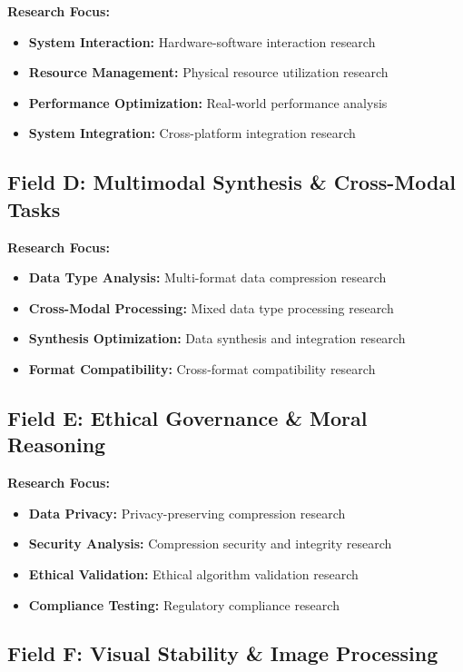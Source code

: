 \documentclass[12pt,a4paper]{article}
\begin{document}
\textbf{Research Focus:}
\begin{itemize}
    \item \textbf{System Interaction:} Hardware-software interaction research
    \item \textbf{Resource Management:} Physical resource utilization research
    \item \textbf{Performance Optimization:} Real-world performance analysis
    \item \textbf{System Integration:} Cross-platform integration research
\end{itemize}

\subsection{Field D: Multimodal Synthesis \& Cross-Modal Tasks}

\textbf{Research Focus:}
\begin{itemize}
    \item \textbf{Data Type Analysis:} Multi-format data compression research
    \item \textbf{Cross-Modal Processing:} Mixed data type processing research
    \item \textbf{Synthesis Optimization:} Data synthesis and integration research
    \item \textbf{Format Compatibility:} Cross-format compatibility research
\end{itemize}

\subsection{Field E: Ethical Governance \& Moral Reasoning}

\textbf{Research Focus:}
\begin{itemize}
    \item \textbf{Data Privacy:} Privacy-preserving compression research
    \item \textbf{Security Analysis:} Compression security and integrity research
    \item \textbf{Ethical Validation:} Ethical algorithm validation research
    \item \textbf{Compliance Testing:} Regulatory compliance research
\end{itemize}

\subsection{Field F: Visual Stability \& Image Processing}
\end{document}
